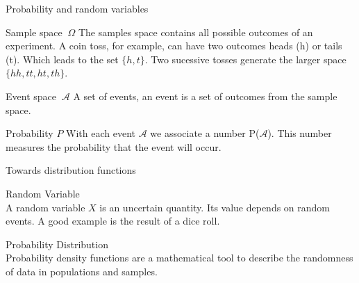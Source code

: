 \documentclass[notes]{beamer}
\begin{document}
    \begin{frame}{Probability and random variables \cite{deisenroth2020mathematics}}
      \begin{block}{Sample space $~\Omega $}
        The samples space contains all possible outcomes of an experiment.
        A coin toss, for example, can have two outcomes heads (h) or tails (t).
        Which leads to the set $\{h, t \}$. Two sucessive tosses generate the
        larger space $\{ hh, tt, ht, th \}$. 
      \end{block}
      \begin{block}{Event space $~\mathcal{A}$}
        A set of events, an event is a set of outcomes from the sample space.
      \end{block}
      \begin{block}{Probability $P$}
        With each event $\mathcal{A}$ we associate a number P($\mathcal{A}$).
        This number measures the probability that the event will occur.
      \end{block}
    \end{frame}
    

    \begin{frame}{Towards distribution functions \cite{haslwanter2016introduction}}
      \begin{block}{Random Variable}
        $\;$ \\
        A random variable $X$ is an uncertain quantity. Its value depends on random events.
        A good example is the result of a dice roll.
      \end{block}

      \begin{block}{Probability Distribution}
        $\;$ \\
        Probability density functions are a mathematical tool to describe the randomness of data
        in populations and samples.
      \end{block}

    \end{frame}
\end{document}
